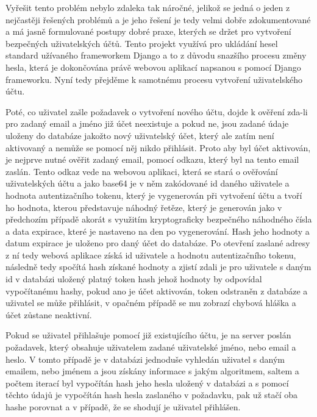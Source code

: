 \documentclass[12pt]{article}
\begin{document}
Vyřešit tento problém nebylo zdaleka tak náročné, jelikož se jedná o jeden z nejčastěji řešených problémů a je jeho řešení je tedy velmi dobře zdokumentované a má jasně formulované postupy dobré praxe, kterých se držet pro vytvoření bezpečných uživatelských účtů. Tento projekt využívá pro ukládání hesel standard užívaného frameworkem Django\cite{djangoJava}\cite{djangoPassword} a to z důvodu snazšího procesu změny hesla, která je dokončována právě webovou aplikací napsanou s pomocí Django frameworku. Nyní tedy přejděme k samotnému procesu vytvoření uživatelského účtu.

Poté, co uživatel zašle požadavek o vytvoření nového účtu, dojde k ověření zda-li pro zadaný email a jméno již účet neexistuje a pokud ne, jsou zadané údaje uloženy do databáze jakožto nový uživatelský účet, který ale zatím není aktivovaný a nemůže se pomocí něj nikdo přihlásit. Proto aby byl účet aktivován, je nejprve nutné ověřit zadaný email, pomocí odkazu, který byl na tento email zaslán\cite{email}. Tento odkaz vede na webovou aplikaci, která se stará o ověřování uživatelských účtu a jako base64 je v něm zakódované id daného uživatele a hodnota autentizačního tokenu, který je vygenerován\cite{tokenCreate} při vytvoření účtu a tvoří ho hodnota, kterou představuje náhodný řetěze, který je generován jako v předchozím případě akorát s využitím kryptograficky bezpečného náhodného čísla a data expirace, které je nastaveno na den po vygenerování. Hash jeho hodnoty a datum expirace je uloženo pro daný účet do databáze. Po otevření zaslané adresy z ní tedy webová aplikace získá id uživatele a hodnotu autentizačního tokenu, následně tedy spočítá hash získané hodnoty a zjistí zdali je pro uživatele s daným id v databázi uložený platný token hash jehož hodnoty by odpovídal vypočítanému hashy\cite{token}, pokud ano je účet aktivován, token odstraněn z databáze a uživatel se může přihlásit, v opačném případě se mu zobrazí chybová hláška a účet zůstane neaktivní.

Pokud se uživatel přihlašuje pomocí již existujícího účtu, je na server poslán požadavek, který obsahuje uživatelem zadané uživatelské jméno, nebo email a heslo. V tomto případě je v databázi jednoduše vyhledán uživatel s daným emailem, nebo jménem a jsou získány informace s jakým algoritmem, saltem a počtem iterací byl vypočítán hash\cite{passwordHash} jeho hesla uložený v databázi a s pomocí těchto údajů je vypočítán hash hesla zaslaného v požadavku, pak už stačí oba hashe porovnat a v případě, že se shodují je uživatel přihlášen.
\end{document}
